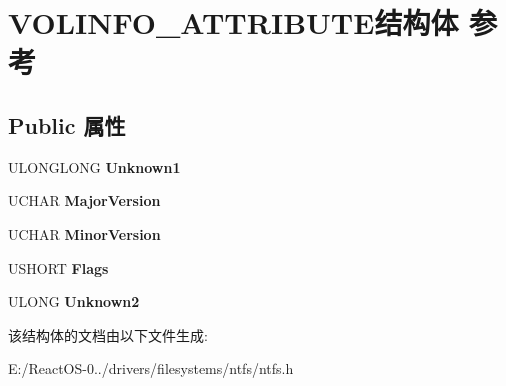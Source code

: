 \hypertarget{struct_v_o_l_i_n_f_o___a_t_t_r_i_b_u_t_e}{}\section{V\+O\+L\+I\+N\+F\+O\+\_\+\+A\+T\+T\+R\+I\+B\+U\+T\+E结构体 参考}
\label{struct_v_o_l_i_n_f_o___a_t_t_r_i_b_u_t_e}
\subsection*{Public 属性}
\begin{DoxyCompactItemize}
\item 
\mbox{\label{struct_v_o_l_i_n_f_o___a_t_t_r_i_b_u_t_e_a838c8b2854b28cfba627b898ba97738f}} 
U\+L\+O\+N\+G\+L\+O\+NG {\bfseries Unknown1}
\item 
\mbox{\label{struct_v_o_l_i_n_f_o___a_t_t_r_i_b_u_t_e_a3d7920b58a239ac7e56d9d918efe7b7a}} 
U\+C\+H\+AR {\bfseries Major\+Version}
\item 
\mbox{\label{struct_v_o_l_i_n_f_o___a_t_t_r_i_b_u_t_e_a340baa7a439d625ff082ab0122b97449}} 
U\+C\+H\+AR {\bfseries Minor\+Version}
\item 
\mbox{\label{struct_v_o_l_i_n_f_o___a_t_t_r_i_b_u_t_e_ac9a2748a130ee9796f45aea1cb773d0d}} 
U\+S\+H\+O\+RT {\bfseries Flags}
\item 
\mbox{\label{struct_v_o_l_i_n_f_o___a_t_t_r_i_b_u_t_e_a74fec317f050150985eb59e6d127a41b}} 
U\+L\+O\+NG {\bfseries Unknown2}
\end{DoxyCompactItemize}


该结构体的文档由以下文件生成\+:\begin{DoxyCompactItemize}
\item 
E\+:/\+React\+O\+S-\/0../drivers/filesystems/ntfs/ntfs.\+h\end{DoxyCompactItemize}
